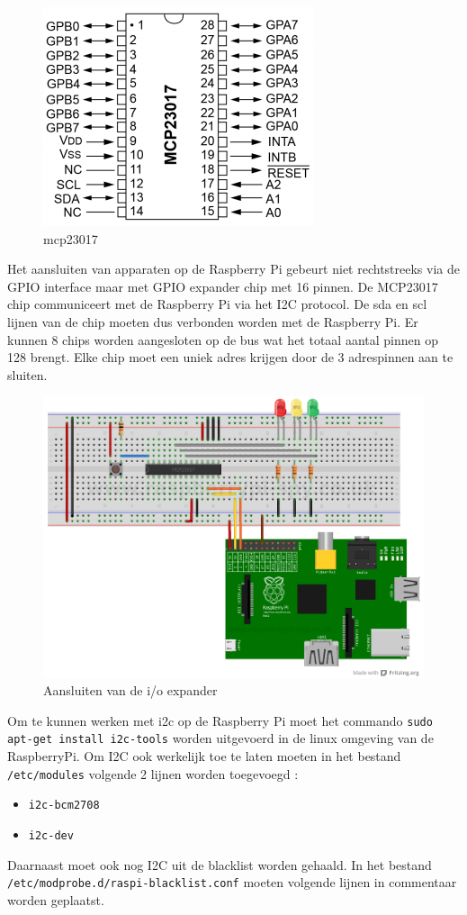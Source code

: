 \documentclass[a4paper,12pt]{article}
\begin{document}
\begin{figure}[ht!]
  \centering
    \includegraphics[scale=0.50]{mcp23017.png}
   \caption*{mcp23017}
\end{figure}
\noindent
Het aansluiten van apparaten op de Raspberry Pi gebeurt niet rechtstreeks via de GPIO interface maar met GPIO expander chip
met 16 pinnen. De MCP23017 chip communiceert met de Raspberry Pi via het I2C protocol. De sda en scl lijnen van de chip moeten dus verbonden worden met de Raspberry Pi. Er kunnen 8 chips worden aangesloten op de bus wat het totaal aantal pinnen op 128 brengt.
Elke chip moet een uniek adres krijgen door de 3 adrespinnen aan te sluiten.

\begin{figure}[ht!]
  \centering
    \includegraphics[scale=1.00]{chiptopi.png}
   \caption*{Aansluiten van de i/o expander}
\end{figure}
\noindent
Om te kunnen werken met i2c op de Raspberry Pi moet het commando \texttt{sudo apt-get install i2c-tools}
worden uitgevoerd in de linux omgeving van de RaspberryPi. Om I2C ook werkelijk toe te laten moeten in het bestand \texttt{/etc/modules} volgende 2 lijnen worden toegevoegd :
\begin{itemize}
\item \texttt{i2c-bcm2708}
\item \texttt{i2c-dev}
\end{itemize}
\noindent
Daarnaast moet ook nog I2C uit de blacklist worden gehaald. In het bestand \texttt{/etc/modprobe.d/raspi-blacklist.conf} moeten volgende lijnen in commentaar worden geplaatst.
\end{document}
